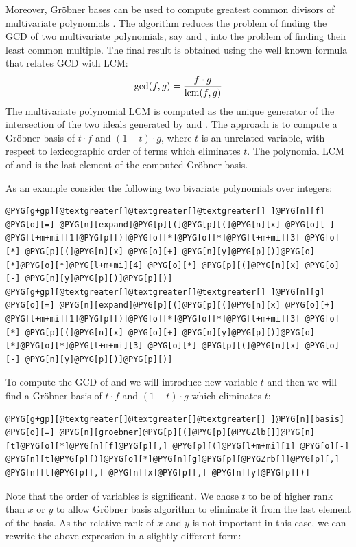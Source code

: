Moreover, Gröbner bases can be used to compute greatest common divisors of multivariate
polynomials \cite{Cox1997ideals}. The algorithm reduces the problem of finding the GCD of two
multivariate polynomials, say  and , into the problem of finding their least
common multiple. The final result is obtained using the well known formula that relates
GCD with LCM:
\hypertarget{equation-gcdlcm}{}\begin{gather}
\begin{split}\gcd(f, g) = \frac{f \cdot g}{\operatorname{lcm}(f, g)}\end{split}\label{src/groebner-gcdlcm}
\end{gather}
The multivariate polynomial LCM is computed as the unique generator of the intersection of
the two ideals generated by  and . The approach is to compute a Gröbner basis
of $t \cdot f$ and $(1 - t) \cdot g$, where $t$ is an unrelated variable, with respect to
lexicographic order of terms which eliminates $t$. The polynomial LCM of  and 
is the last element of the computed Gröbner basis.

As an example consider the following two bivariate polynomials over integers:

\begin{Verbatim}[commandchars=@\[\]]
@PYG[g+gp][@textgreater[]@textgreater[]@textgreater[] ]@PYG[n][f] @PYG[o][=] @PYG[n][expand]@PYG[p][(]@PYG[p][(]@PYG[n][x] @PYG[o][-] @PYG[l+m+mi][1]@PYG[p][)]@PYG[o][*]@PYG[o][*]@PYG[l+m+mi][3] @PYG[o][*] @PYG[p][(]@PYG[n][x] @PYG[o][+] @PYG[n][y]@PYG[p][)]@PYG[o][*]@PYG[o][*]@PYG[l+m+mi][4] @PYG[o][*] @PYG[p][(]@PYG[n][x] @PYG[o][-] @PYG[n][y]@PYG[p][)]@PYG[p][)]
@PYG[g+gp][@textgreater[]@textgreater[]@textgreater[] ]@PYG[n][g] @PYG[o][=] @PYG[n][expand]@PYG[p][(]@PYG[p][(]@PYG[n][x] @PYG[o][+] @PYG[l+m+mi][1]@PYG[p][)]@PYG[o][*]@PYG[o][*]@PYG[l+m+mi][3] @PYG[o][*] @PYG[p][(]@PYG[n][x] @PYG[o][+] @PYG[n][y]@PYG[p][)]@PYG[o][*]@PYG[o][*]@PYG[l+m+mi][3] @PYG[o][*] @PYG[p][(]@PYG[n][x] @PYG[o][-] @PYG[n][y]@PYG[p][)]@PYG[p][)]
\end{Verbatim}
\noindent
To compute the GCD of  and  we will introduce new variable $t$ and then we will
find a Gröbner basis of $t \cdot f$ and $(1 - t) \cdot g$ which eliminates $t$:

\begin{Verbatim}[commandchars=@\[\]]
@PYG[g+gp][@textgreater[]@textgreater[]@textgreater[] ]@PYG[n][basis] @PYG[o][=] @PYG[n][groebner]@PYG[p][(]@PYG[p][@PYGZlb[]]@PYG[n][t]@PYG[o][*]@PYG[n][f]@PYG[p][,] @PYG[p][(]@PYG[l+m+mi][1] @PYG[o][-] @PYG[n][t]@PYG[p][)]@PYG[o][*]@PYG[n][g]@PYG[p][@PYGZrb[]]@PYG[p][,] @PYG[n][t]@PYG[p][,] @PYG[n][x]@PYG[p][,] @PYG[n][y]@PYG[p][)]
\end{Verbatim}
\noindent
Note that the order of variables is significant. We chose $t$ to be of higher rank than
$x$ or $y$ to allow Gröbner basis algorithm to eliminate it from the last element of
the basis. As the relative rank of $x$ and $y$ is not important in this case, we can
rewrite the above expression in a slightly different form:

